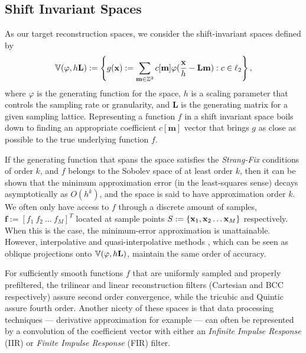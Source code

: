 \subsection{Shift Invariant Spaces} \label{sec:sis_review}
As our target reconstruction spaces, we consider the shift-invariant spaces defined by {\small 
\begin{equation*}
	\mathbb{V}(\varphi, h\mathbf{L}) := \left\{ g(\mathbf{x}) := \displaystyle\sum_{\mathbf{m} \in \mathbb{Z}^3} c[\mathbf{m}]\varphi(\frac{\mathbf{x}}{h} - \mathbf{Lm}) : c \in \ell_2 \right\},
\end{equation*}}
where $\varphi$ is the generating function for the space, $h$ is a scaling parameter that controls the sampling rate or granularity, and $\mathbf{L}$ is the generating matrix for a given sampling lattice. Representing a function $f$ in a shift invariant space boils down to finding an appropriate coefficient $c[\mathbf{m}]$ vector that brings $g$ as close as possible to the true underlying function $f$. 

If the generating function that spans the space satisfies the \emph{Strang-Fix} conditions of order $k$, and $f$ belongs to the Sobolev space of at least order $k$, then it can be shown that the minimum approximation error (in the least-squares sense) decays asymptotically as $O(h^k)$, and the space is said to have approximation order $k$. We often only have access to $f$ through a discrete amount of samples, $\mathbf{f} := \left[ f_1 \ f_2 \ \hdots \ f_M \right]^T$ located at sample points $S := \{\mathbf{x}_1, \mathbf{x}_2 \hdots \mathbf{x}_M \}$ respectively. When this is the case, the minimum-error approximation is unattainable. However, interpolative and quasi-interpolative methods \cite{quasibcc,interprev}, which can be seen as oblique projections onto $\mathbb{V}(\varphi, h\mathbf{L})$, maintain the same order of accuracy.

For sufficiently smooth functions $f$ that are uniformly sampled and properly prefiltered, the trilinear and linear reconstruction filters (Cartesian and BCC respectively) assure second order convergence, while the tricubic and Quintic assure fourth order. Another nicety of these spaces is that data processing techniques --- derivative approximation for example --- can often be represented by a convolution of the coefficient vector with either an \emph{Infinite Impulse Response} (IIR) or \emph{Finite Impulse Response} (FIR) filter. 

